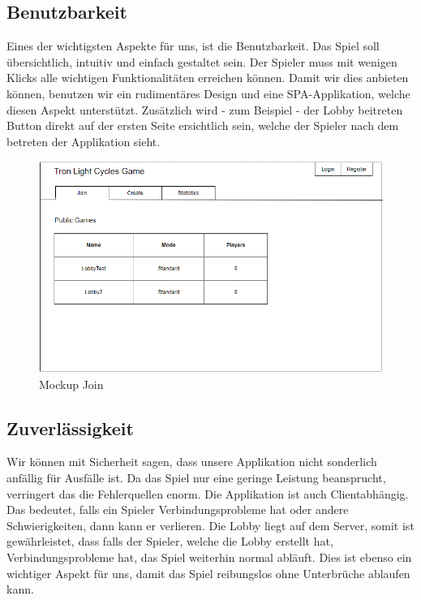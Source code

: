 \documentclass[11pt,ngerman]{article}
\begin{document}
        \subsection{Benutzbarkeit}
        Eines der wichtigsten Aspekte für uns, ist die Benutzbarkeit. Das Spiel soll übersichtlich, intuitiv und einfach gestaltet sein. Der Spieler muss mit wenigen Klicks alle wichtigen Funktionalitäten erreichen können. Damit wir dies anbieten können, benutzen wir ein rudimentäres Design und eine \Gls{SPA}-Applikation, welche diesen Aspekt unterstützt. Zusätzlich wird - zum Beispiel - der \Gls{Lobby} beitreten Button direkt auf der ersten Seite ersichtlich sein, welche der Spieler nach dem betreten der Applikation sieht.
        \begin{figure}[H]
            \centering
            \includegraphics[scale=0.6]{figures/Mockup_Join.png}
            \caption{Mockup Join}
            \label{fig:MockupJoin}
        \end{figure}
        \subsection{Zuverlässigkeit}
        Wir können mit Sicherheit sagen, dass unsere Applikation nicht sonderlich anfällig für Ausfälle ist. Da das Spiel nur eine geringe Leistung beansprucht, verringert das die Fehlerquellen enorm. Die Applikation ist auch Clientabhängig. Das bedeutet, falls ein Spieler Verbindungsprobleme hat oder andere Schwierigkeiten, dann kann er verlieren. Die Lobby liegt auf dem Server, somit ist gewährleistet, dass falls der Spieler, welche die Lobby erstellt hat, Verbindungsprobleme hat, das Spiel weiterhin normal abläuft. Dies ist ebenso ein wichtiger Aspekt für uns, damit das Spiel reibungslos ohne Unterbrüche ablaufen kann.
\end{document}
